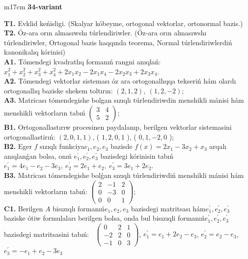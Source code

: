 \documentclass{article}
\begin{document}
\begin{tabular}{m{17cm}}
\textbf{34-variant}
\newline

\textbf{T1.} Evklid keńisligi. (Skalyar kóbeyme, ortogonal vektorlar, ortonormal bazis.) \\
\textbf{T2.} Óz-ara orın almasıwshı túrlendiriwler. (Óz-ara orın almasıwshı túrlendiriwler,  Ortogonal bazis haqqında teorema,  Normal túrlendiriwlerdiń kanonikalıq kórinisi) \\
\textbf{A1.} Tómendegi kvadratlıq formanıń rangni anıqlań: \(x_{1}^{2} + x_{2}^{2} + x_{3}^{2} + x_{4}^{2} + 2x_{1}x_{2} - 2x_{1}x_{4} - 2x_{2}x_{3} + 2x_{3}x_{4}\). \\
\textbf{A2.} Tómendegi vektorlar sisteması óz ara ortogonallıqqa tekseriń hám olardı ortogonallıq baziske shekem toltırın: \((2,1,2),\ (1,2, - 2)\); \\
\textbf{A3.} Matricası tómendegishe bolgan sızıqlı túrlendiriwdin menshikli mánisi hám menshikli vektorların tabıń \(\begin{pmatrix} 3 & 4 \\ 5 & 2 \end{pmatrix}\); \\
\textbf{B1.} Ortogonallastırıw procesinen paydalanıp, berilgen vektorlar sistemasini ortogonallastirıń: \((2,0,1,1)\), ( \(1,2,0,1\) ), ( \(0,1, - 2,0\) ); \\
\textbf{B2.} Eger \(f\) sızıqlı funkciya\(e_{1},e_{2},e_{3}\) bazisde \(f(x) = 2x_{1} - 3x_{2} + x_{3}\) arqalı anıqlanǵan bolsa, onıń \(e_{1}^{'},e_{2}^{'},e_{3}^{'}\) bazisdegi kórinisin tabıń\(e_{1}^{'} = 4e_{1} - e_{2} - 3e_{3},\ e_{2}^{'} = 2e_{1} + e_{2},\ e_{3}^{'} = 3e_{1} + 2e_{2}\). \\
\textbf{B3.} Matricası tómendegishe bolǵan sızıqlı túrlendiriwdiń menshikli mánisi hám menshikli vektorların tabıń: \(\begin{pmatrix} 2 & - 1 & 2 \\ 0 & - 3 & 0 \\ 0 & 0 & 1 \end{pmatrix}\); \\
\textbf{C1.} Berilgen \(A\) bisızıqlı formanıń\(e_{1},e_{2},e_{3}\) bazisdegi matritsası hám\(e_{1}^{'},e_{2}^{'},e_{3}^{'}\) baziske ótiw formulaları berilgen bolsa, onda bul bisızıqli formanıń\(e_{1}^{'},e_{2}^{'},e_{3}^{'}\) bazisdegi matritsasini tabıń: \(\ \) \(\begin{pmatrix} 0 & 2 & 1 \\  - 2 & 2 & 0 \\  - 1 & 0 & 3 \end{pmatrix}\), \(e_{1}^{'} = e_{1} + 2e_{2} - e_{3}\), \(e_{2}^{'} = e_{2} - e_{3}\), \(e_{3}^{'} = - e_{1} + e_{2} - 3e_{3}\) \\

\end{tabular}
\end{document}
